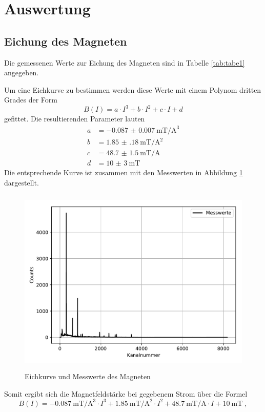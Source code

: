 \section{Auswertung}

\subsection{Eichung des Magneten}
Die gemessenen Werte zur Eichung des Magneten sind in Tabelle \ref{tab:tabe1} angegeben.

Um eine Eichkurve zu bestimmen werden diese Werte mit einem Polynom dritten Grades
der Form
\begin{equation}
  B(I)=a\cdot I^3+b\cdot I^2 + c \cdot I +d
\end{equation}
gefittet.
Die resultierenden Parameter lauten
\begin{align*}
  a &= \SI{-0.087(7)}{\milli\tesla\per\cubic\ampere} \\
  b &= \SI{1.85(18)}{\milli\tesla\per\square\ampere}\\
  c &= \SI{48.7(15)}{\milli\tesla\per\ampere}\\
  d &= \SI{10(3)}{\milli\tesla}
\end{align*}
Die entsprechende Kurve ist zusammen mit den Messwerten in Abbildung \ref{fig:plot1}
dargestellt.
\begin{figure}
  \centering
  \includegraphics[height=9cm]{Plot1.pdf}
  \caption{Eichkurve und Messwerte des Magneten}
  \label{fig:plot1}
\end{figure}
Somit ergibt sich die Magnetfeldstärke bei gegebenem Strom über die Formel
\begin{equation}
  B(I)=\SI{-0.087}{\milli\tesla\per\cubic\ampere}\cdot I^3
  +\SI{1.85}{\milli\tesla\per\square\ampere}\cdot I^2
  +\SI{48.7}{\milli\tesla\per\ampere} \cdot I + \SI{10}{\milli\tesla} \; ,
  \label{eqn:bfeld}
\end{equation}
